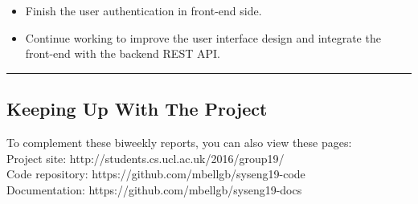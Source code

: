 \documentclass[11pt]{report}
\begin{document}
\bigskip
{}
\smallskip

\noindent
\begin{itemize}
    \item Finish the user authentication in front-end side.
    \item Continue working to improve the user interface design and integrate
        the front-end with the backend REST API\@.
\end{itemize}

\hrule

\subsection*{Keeping Up With The Project}

To complement these biweekly reports, you can also view these pages:\\

\noindent
Project site: http://students.cs.ucl.ac.uk/2016/group19/\\

\noindent
Code repository: https://github.com/mbellgb/syseng19-code\\

\noindent
Documentation: https://github.com/mbellgb/syseng19-docs
\end{document}
